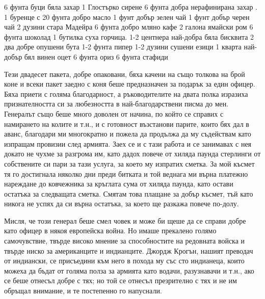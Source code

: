 \documentclass[12pt]{book}
\begin{document}
  6 фунта буци бяла захар           1 Глостърко сирене
  6 фунта добра нерафинирана захар .            1 буренце с 20 фунта добро масло
  1 фунт добър зелен чай
  1 фунт добър черен чай                    2 дузини стара Мадейра
  6 фунта добро мляно кафе      2 галона ямайски ром 
  6 фунта шоколад           1 бутилка суха горчица.
  1-2 центнера най-добра бяла бисквита  2 два добре опушени бута
  1-2 фунта пипер           1-2 дузини сушени езици
  1 кварта най-добър бял винен оцет     6 фунта ориз
                                       6 фунта стафиди

Тези двадесет пакета, добре опаковани, бяха качени на също толкова на брой коне и всеки пакет заедно с коня беше предназначен за подарък за един офицер. Бяха приети с голяма благодарност, а ръководителите на двата полка изразиха признателността си за любезността в най-благодарствени писма до мен. Генералът също беше много доволен от начина, по който се справих с намирането на колите и т.н., и с готовност възстанови парите, които бях дал в аванс, благодари ми многократно и пожела да продължа да му съдействам като изпращам провизии след армията. Заех се и с тази работа и се занимавах с нея докато не чухме за разгрома им, като дадох повече от хиляда паунда стерлинги от собствените си пари за тази услуга, за което му изпратих сметка. За мой късмет тя го достигнала няколко дни преди битката и той веднага ми върна платежно нареждане до ковчежника за кръглата сума от хиляда паунда, като остави остатъка за следващата сметка. Смятам това плащане за добър късмет, тъй като никога не успях да си върна остатъка, за което ще разкажа повече по-долу.

Мисля, че този генерал беше смел човек и може би щеше да се справи добре като офицер в някоя европейска война. Но имаше прекалено голямо самочувствие, твърде високо мнение за способностите на редовната войска и твърде ниско за американците и индианците. Джордж Крогън, нашият преводач от индиански, се присъедини към него в похода му със сто индианеца, които можеха да бъдат от голяма полза за армията като водачи, разузнавачи и т.н., ако се беше отнесъл добре с тях; но той се отнесъл презрително с тях и не им обръщал внимание, и те постепенно го напуснали.
\end{document}
